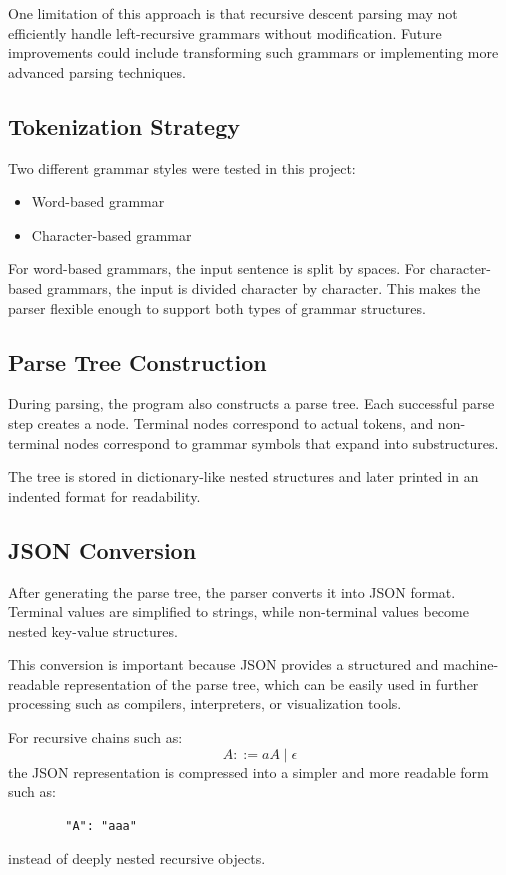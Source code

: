 \documentclass[12pt,a4paper]{article}
\begin{document}
	One limitation of this approach is that recursive descent parsing may not efficiently handle left-recursive grammars without modification. Future improvements could include transforming such grammars or implementing more advanced parsing techniques.
	
	\subsection{Tokenization Strategy}
	Two different grammar styles were tested in this project:
	\begin{itemize}
		\item Word-based grammar
		\item Character-based grammar
	\end{itemize}
	
	For word-based grammars, the input sentence is split by spaces. For character-based grammars, the input is divided character by character. This makes the parser flexible enough to support both types of grammar structures.
	
	\subsection{Parse Tree Construction}
	During parsing, the program also constructs a parse tree. Each successful parse step creates a node. Terminal nodes correspond to actual tokens, and non-terminal nodes correspond to grammar symbols that expand into substructures.
	
	The tree is stored in dictionary-like nested structures and later printed in an indented format for readability.
	
	\subsection{JSON Conversion}
	After generating the parse tree, the parser converts it into JSON format. Terminal values are simplified to strings, while non-terminal values become nested key-value structures.
	
	This conversion is important because JSON provides a structured and machine-readable representation of the parse tree, which can be easily used in further processing such as compilers, interpreters, or visualization tools.
	
	For recursive chains such as:
	\[
	A ::= aA \; | \; \epsilon
	\]
	the JSON representation is compressed into a simpler and more readable form such as:
	\begin{verbatim}
		"A": "aaa"
	\end{verbatim}
	instead of deeply nested recursive objects.
	
\end{document}
